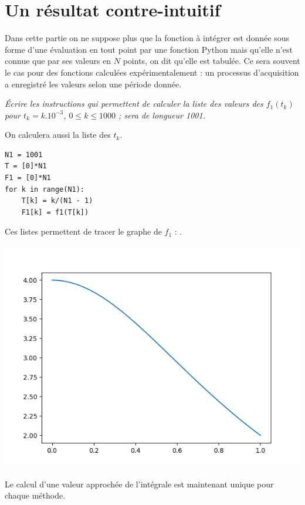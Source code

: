 \section{Un résultat contre-intuitif}
Dans cette partie on ne suppose plus que la fonction à intégrer est donnée sous forme d'une évaluation en tout point par une fonction Python mais qu'elle n'est connue que par ses valeurs en $N$ points, on dit qu'elle est tabulée. Ce sera souvent le cas pour des fonctions calculées expérimentalement : un processus d'acquisition a enregistré les valeurs selon une période donnée.
\begin{Exercise}\it
Écrire les instructions qui permettent de calculer la liste  des valeurs des $f_1(t_k)$ pour $t_k = k.10^{-3}$, $0 \le k \le 1000$ ;  sera de longueur 1001.

On calculera aussi la liste  des $t_k$.
\end{Exercise}
\begin{Answer}
\begin{lstlisting}
N1 = 1001
T = [0]*N1
F1 = [0]*N1
for k in range(N1):
    T[k] = k/(N1 - 1)
    F1[k] = f1(T[k])
\end{lstlisting}
\end{Answer}
Ces listes permettent de tracer le graphe de $f_1$ : .
\begin{center}
\includegraphics[scale=0.5]{TP/Images/TP18_f1.png}
\end{center}
Le calcul d'une valeur approchée de l'intégrale est maintenant unique pour chaque méthode.

